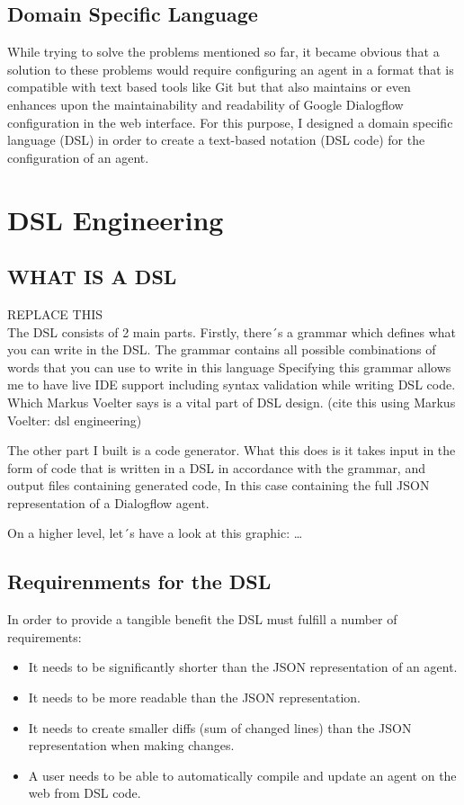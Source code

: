 \subsection{Domain Specific Language}
While trying to solve the problems mentioned so far, it became obvious that a solution to these problems would require configuring an agent in a format that is compatible with text based tools like Git but that also maintains or even enhances upon the maintainability and readability of Google Dialogflow configuration in the web interface.
For this purpose, I designed a domain specific language (DSL) in order to create a text-based notation (DSL code) for the configuration of an agent.


\section{DSL Engineering}


\subsection{WHAT IS A DSL}
REPLACE THIS\\
The DSL consists of 2 main parts.
Firstly, there´s a grammar which defines what you can write in the DSL.
The grammar contains all possible combinations of words that you can use to write in this language
Specifying this grammar allows me to have live IDE support including syntax validation while writing DSL code. Which Markus Voelter says is a vital part of DSL design. \citeNeeded (cite this using Markus Voelter: dsl engineering)

The other part I built is a code generator.
What this does is it takes input in the form of code that is written in a DSL in accordance with the grammar, and output files containing generated code,
In this case containing the full JSON representation of a Dialogflow agent.

On a higher level, let´s have a look at this graphic: …

\subsection{Requirenments for the DSL}

In order to provide a tangible benefit the DSL must fulfill a number of requirements:
\begin{itemize}
    \item It needs to be significantly shorter than the JSON representation of an agent.
    \item It needs to be more readable than the JSON representation.
    \item It needs to create smaller diffs (sum of changed lines) than the JSON representation when making changes.
    \item A user needs to be able to automatically compile and update an agent on the web from DSL code.
\end{itemize}

